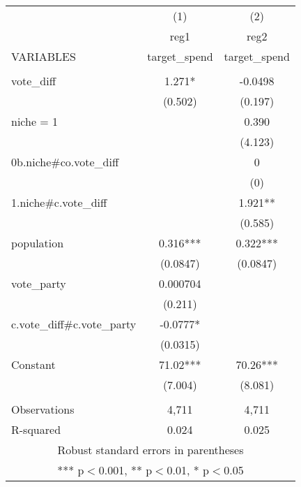 \documentclass[]{article}
\begin{document}
\begin{tabular}{lcc} \hline
 & (1) & (2) \\
 & reg1 & reg2 \\
VARIABLES & target\_spend & target\_spend \\ \hline
 &  &  \\
vote\_diff & 1.271* & -0.0498 \\
 & (0.502) & (0.197) \\
niche = 1 &  & 0.390 \\
 &  & (4.123) \\
0b.niche\#co.vote\_diff &  & 0 \\
 &  & (0) \\
1.niche\#c.vote\_diff &  & 1.921** \\
 &  & (0.585) \\
population & 0.316*** & 0.322*** \\
 & (0.0847) & (0.0847) \\
vote\_party & 0.000704 &  \\
 & (0.211) &  \\
c.vote\_diff\#c.vote\_party & -0.0777* &  \\
 & (0.0315) &  \\
Constant & 71.02*** & 70.26*** \\
 & (7.004) & (8.081) \\
 &  &  \\
Observations & 4,711 & 4,711 \\
 R-squared & 0.024 & 0.025 \\ \hline
\multicolumn{3}{c}{ Robust standard errors in parentheses} \\
\multicolumn{3}{c}{ *** p$<$0.001, ** p$<$0.01, * p$<$0.05} \\
\end{tabular}
\end{document}
